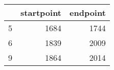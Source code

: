 % 
\begin{tabular}{rrr}
  \hline
 & startpoint & endpoint \\ 
  \hline
5 & 1684 & 1744 \\ 
  6 & 1839 & 2009 \\ 
  9 & 1864 & 2014 \\ 
   \hline
\end{tabular}
